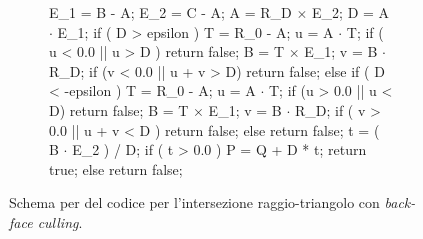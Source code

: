 \begin{figure}[htbp]
	\centering
	\begin{subfigure}{.65\linewidth}
	\begin{pseudoc}
	E_1 = B - A;
	E_2 = C - A;
	A = R_D $\times$ E_2;
	D = A $\cdot$ E_1;
	if ( D > epsilon ) {
		T = R_0 - A;
		u = A $\cdot$ T;
		if ( u < 0.0 || u > D ) return false;
		B = T $\times$ E_1;
		v = B $\cdot$ R_D;
		if (v < 0.0 || u + v > D) return false;
	} else if ( D < -epsilon ) {
		T = R_0 - A;
		u = A $\cdot$ T;
		if (u > 0.0 || u < D) return false;
		B = T $\times$ E_1;
		v = B $\cdot$ R_D;
		if ( v > 0.0 || u + v < D ) return false;
	} else {
		return false;
	}
	t = ( B $\cdot$ E_2 ) / D;
	if ( t > 0.0 ) {
		P = Q + D * t;
		return true;
	} else {
		return false;
	}
	\end{pseudoc}
	\end{subfigure}
	\caption{Schema per del codice per l'intersezione raggio-triangolo con \textit{back-face culling}.}
\end{figure}
